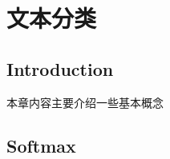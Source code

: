 	
\section{文本分类}
	\subsection*{Introduction}
	本章内容主要介绍一些基本概念
	
	\subsection{Softmax}
	
	
	
	
	
	
	
	
	
	
	
	
	
	
	
	
	
	
	
	
	
	
	
	
	
	
	
	
	
	
	
	
	
	    	
	
	